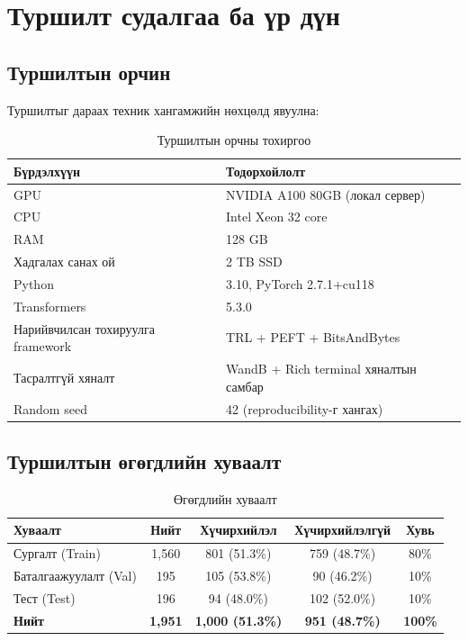
\chapter{Туршилт судалгаа ба үр дүн}

\section{Туршилтын орчин}

Туршилтыг дараах техник хангамжийн нөхцөлд явуулна:

\begin{table}[htbp]
\centering
\caption{Туршилтын орчны тохиргоо}
\label{tab:experiment_env}
\begin{tabular}{ll}
\hline
\textbf{Бүрдэлхүүн} & \textbf{Тодорхойлолт} \\
\hline
GPU                    & NVIDIA A100 80GB (локал сервер) \\
CPU                    & Intel Xeon 32 core \\
RAM                    & 128 GB \\
Хадгалах санах ой      & 2 TB SSD \\
Python                 & 3.10, PyTorch 2.7.1+cu118 \\
Transformers           & 5.3.0 \\
Нарийвчилсан тохируулга framework  & TRL + PEFT + BitsAndBytes \\
Тасралтгүй хяналт      & WandB + Rich terminal хяналтын самбар \\
Random seed            & 42 (reproducibility-г хангах) \\
\hline
\end{tabular}
\end{table}

\section{Туршилтын өгөгдлийн хуваалт}

\begin{table}[htbp]
\centering
\caption{Өгөгдлийн хуваалт}
\label{tab:data_split_exp}
\begin{tabular}{lcccc}
\hline
\textbf{Хуваалт} & \textbf{Нийт} & \textbf{Хүчирхийлэл} & \textbf{Хүчирхийлэлгүй} & \textbf{Хувь} \\
\hline
Сургалт (Train)          & 1,560 & 801 (51.3\%)       & 759 (48.7\%)       & 80\% \\
Баталгаажуулалт (Val)    & 195   & 105 (53.8\%)       & 90 (46.2\%)        & 10\% \\
Тест (Test)              & 196   & 94 (48.0\%)        & 102 (52.0\%)       & 10\% \\
\hline
\textbf{Нийт}             & \textbf{1,951} & \textbf{1,000 (51.3\%)} & \textbf{951 (48.7\%)} & \textbf{100\%} \\
\hline
\end{tabular}
\end{table}

